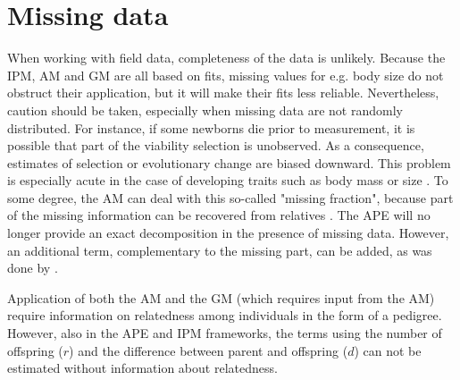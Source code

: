 \section{Missing data}
\label{app:miss}

When working with field data, completeness of the data is unlikely. Because the IPM, AM and GM are all based on fits, missing values for e.g. body size do not obstruct their application, but it will make their fits less reliable. Nevertheless, caution should be taken, especially when missing data are not randomly distributed. For instance, if some newborns die prior to measurement, it is possible that part of the viability selection is unobserved. As a consequence, estimates of selection or evolutionary change are biased downward. This problem is especially acute in the case of developing traits such as body mass or size \citep{Hadfield2008}. To some degree, the AM can deal with this so-called "missing fraction", because part of the missing information can be recovered from relatives \citep{Hadfield2008}. The APE will no longer provide an exact decomposition in the presence of missing data. However, an additional term, complementary to the missing part, can be added, as was done by \citet{Ozgul2009}.

Application of both the AM and the GM (which requires input from the AM) require information on relatedness among individuals in the form of a pedigree. However, also in the APE and IPM frameworks, the terms using the number of offspring ($r$) and the difference between parent and offspring ($d$) can not be estimated without information about relatedness.